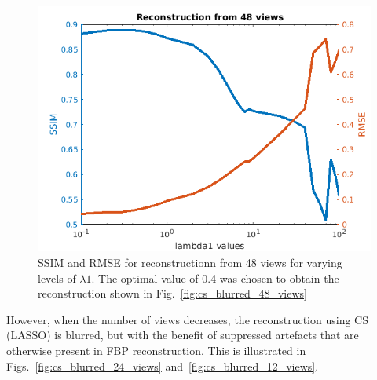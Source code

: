 \documentclass{article}
\begin{document}
\begin{figure}[!h]
\centering
       \includegraphics[width=0.9\columnwidth]{../images/potato/2D/cs_blurred_results/SSIM_RMSE_48_angles.png}
\caption{SSIM and RMSE for reconstructionn from 48 views for varying levels of $\lambda1$. The optimal value of 0.4 was chosen to obtain the reconstruction shown in Fig.~\ref{fig:cs_blurred_48_views}}
\label{fig:ssim_rmse_48_views}
\end{figure}
\newpage

However, when the number of views decreases, the reconstruction using CS (LASSO) is blurred, but with the benefit of suppressed artefacts that are otherwise present in FBP reconstruction. This is illustrated in Figs.~\ref{fig:cs_blurred_24_views} and~\ref{fig:cs_blurred_12_views}.
\end{document}
